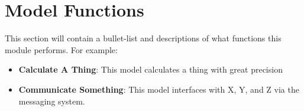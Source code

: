 \section{Model Functions}
This section will contain a bullet-list and descriptions of what functions this module performs. For example:
\begin{itemize}
	\item \textbf{Calculate A Thing}: This model calculates a thing with great precision
	\item \textbf{Communicate Something}: This model interfaces with X, Y, and Z via the messaging system.
\end{itemize}